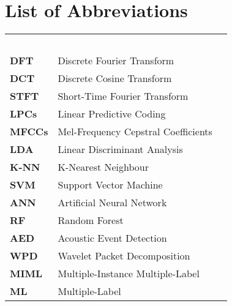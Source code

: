 

\chapter*{List of Abbreviations}


\renewcommand{\arraystretch}{1.4} 
\begin{longtable}{llr}
\multicolumn{3}{l}{\textbf{}\hspace{0.4\textwidth}~~}\\
\textbf{DFT}   &                    Discrete Fourier Transform \\
\textbf{DCT}    &                    Discrete Cosine Transform \\
\textbf{STFT} & Short-Time Fourier Transform \\
\textbf{LPCs}	 &                   Linear Predictive Coding \\
\textbf{MFCCs} &	       Mel-Frequency Cepstral Coefficients \\
\textbf{LDA}      &                  Linear Discriminant Analysis \\
\textbf{K-NN}	  &                  K-Nearest Neighbour \\
\textbf{SVM}	     &               Support Vector Machine \\
\textbf{ANN}    &                   Artificial Neural Network \\
\textbf{RF}     &                      Random Forest \\
\textbf{AED}	   &                 Acoustic Event Detection \\
\textbf{WPD}     &                 Wavelet Packet Decomposition \\
\textbf{MIML}   &                 Multiple-Instance Multiple-Label  \\ 
\textbf{ML}    &                      Multiple-Label \\
\end{longtable}

